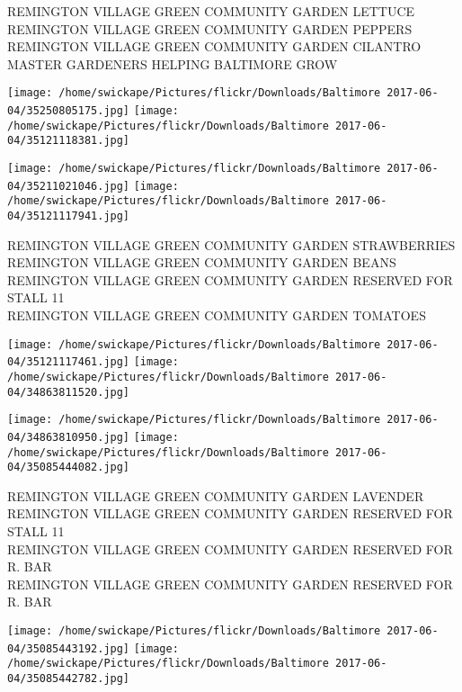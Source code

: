 \documentclass[10pt,letterpaper]{article}
\begin{document}
REMINGTON VILLAGE GREEN COMMUNITY GARDEN LETTUCE\\
REMINGTON VILLAGE GREEN COMMUNITY GARDEN PEPPERS\\
REMINGTON VILLAGE GREEN COMMUNITY GARDEN CILANTRO\\
MASTER GARDENERS HELPING BALTIMORE GROW\\
\pagebreak

\texttt{[image: /home/swickape/Pictures/flickr/Downloads/Baltimore 2017-06-04/35250805175.jpg]}
\texttt{[image: /home/swickape/Pictures/flickr/Downloads/Baltimore 2017-06-04/35121118381.jpg]}

\texttt{[image: /home/swickape/Pictures/flickr/Downloads/Baltimore 2017-06-04/35211021046.jpg]}
\texttt{[image: /home/swickape/Pictures/flickr/Downloads/Baltimore 2017-06-04/35121117941.jpg]}

REMINGTON VILLAGE GREEN COMMUNITY GARDEN STRAWBERRIES\\
REMINGTON VILLAGE GREEN COMMUNITY GARDEN BEANS\\
REMINGTON VILLAGE GREEN COMMUNITY GARDEN RESERVED FOR STALL 11\\
REMINGTON VILLAGE GREEN COMMUNITY GARDEN TOMATOES\\
\pagebreak

\texttt{[image: /home/swickape/Pictures/flickr/Downloads/Baltimore 2017-06-04/35121117461.jpg]}
\texttt{[image: /home/swickape/Pictures/flickr/Downloads/Baltimore 2017-06-04/34863811520.jpg]}

\texttt{[image: /home/swickape/Pictures/flickr/Downloads/Baltimore 2017-06-04/34863810950.jpg]}
\texttt{[image: /home/swickape/Pictures/flickr/Downloads/Baltimore 2017-06-04/35085444082.jpg]}

REMINGTON VILLAGE GREEN COMMUNITY GARDEN LAVENDER\\
REMINGTON VILLAGE GREEN COMMUNITY GARDEN RESERVED FOR STALL 11\\
REMINGTON VILLAGE GREEN COMMUNITY GARDEN RESERVED FOR R. BAR\\
REMINGTON VILLAGE GREEN COMMUNITY GARDEN RESERVED FOR R. BAR\\
\pagebreak

\texttt{[image: /home/swickape/Pictures/flickr/Downloads/Baltimore 2017-06-04/35085443192.jpg]}
\texttt{[image: /home/swickape/Pictures/flickr/Downloads/Baltimore 2017-06-04/35085442782.jpg]}
\end{document}
